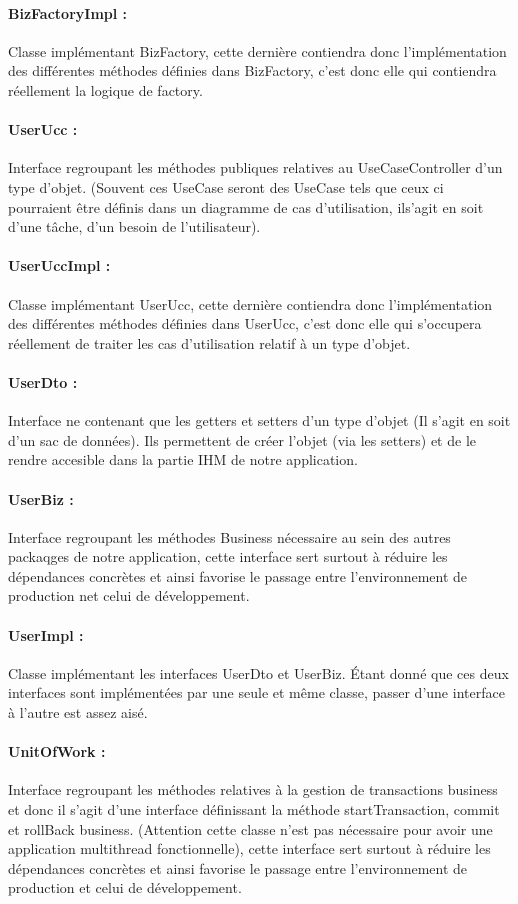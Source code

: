 \documentclass{article}[12pt]
\begin{document}
\paragraph{BizFactoryImpl : } Classe implémentant BizFactory, cette dernière contiendra donc l'implémentation des différentes méthodes définies dans BizFactory, c'est donc elle qui contiendra réellement la logique de factory.
\paragraph{UserUcc : } Interface regroupant les méthodes publiques relatives au UseCaseController d'un type d'objet. (Souvent ces UseCase seront des UseCase tels que ceux ci pourraient être définis dans un diagramme de cas d'utilisation, ils'agit en soit d'une tâche, d'un besoin de l'utilisateur).
\paragraph{UserUccImpl : } Classe implémentant UserUcc, cette dernière contiendra donc l'implémentation des différentes méthodes définies dans UserUcc, c'est donc elle qui s'occupera réellement de traiter les cas d'utilisation relatif à un type d'objet.
\paragraph{UserDto : } Interface ne contenant que les getters et setters d'un type d'objet (Il s'agit en soit d'un sac de données). Ils permettent de créer l'objet (via les setters) et de le rendre accesible dans la partie IHM de notre application.
\paragraph{UserBiz : } Interface regroupant les méthodes Business nécessaire au sein des autres packaqges de notre application, cette interface sert surtout à réduire les dépendances concrètes et ainsi favorise le passage entre l’environnement de production net celui de développement. 
\paragraph{UserImpl : } Classe implémentant les interfaces UserDto et UserBiz. Étant donné que ces deux interfaces sont implémentées par une seule et même classe, passer d'une interface à l'autre est assez aisé.
\paragraph{UnitOfWork : } Interface regroupant les méthodes relatives à la gestion de transactions business et donc il s'agit d'une interface définissant la méthode startTransaction, commit et rollBack business. (Attention cette classe n'est pas nécessaire pour avoir une application multithread fonctionnelle), cette interface sert surtout à réduire les dépendances concrètes et ainsi favorise le passage entre l’environnement de production et celui de développement. 
\end{document}
